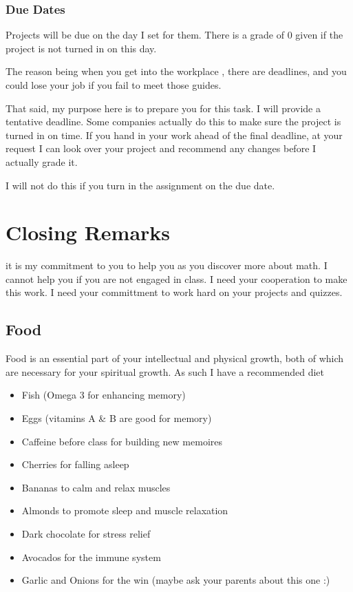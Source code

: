 \documentclass[]{article}
\begin{document}
\subsubsection{Due Dates}\label{due-dates}

Projects will be due on the day I set for them. There is a grade of 0
given if the project is not turned in on this day.

The reason being when you get into the workplace , there are deadlines,
and you could lose your job if you fail to meet those guides.

That said, my purpose here is to prepare you for this task. I will
provide a tentative deadline. Some companies actually do this to make
sure the project is turned in on time. If you hand in your work ahead of
the final deadline, at your request I can look over your project and
recommend any changes before I actually grade it.

I will not do this if you turn in the assignment on the due date.

\section{Closing Remarks}\label{closing-remarks}

it is my commitment to you to help you as you discover more about math.
I cannot help you if you are not engaged in class. I need your
cooperation to make this work. I need your committment to work hard on
your projects and quizzes.

\subsection{Food}\label{food}

Food is an essential part of your intellectual and physical growth, both
of which are necessary for your spiritual growth. As such I have a
recommended diet

\begin{itemize}
\itemsep1pt\parskip0pt
\item
  Fish (Omega 3 for enhancing memory)
\item
  Eggs (vitamins A \& B are good for memory)
\item
  Caffeine before class for building new memoires
\item
  Cherries for falling asleep
\item
  Bananas to calm and relax muscles
\item
  Almonds to promote sleep and muscle relaxation
\item
  Dark chocolate for stress relief
\item
  Avocados for the immune system
\item
  Garlic and Onions for the win (maybe ask your parents about this one
  :)
\end{itemize}
\end{document}
